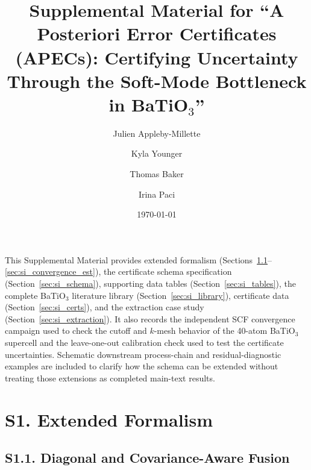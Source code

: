 ﻿\documentclass[prb,onecolumn,superscriptaddress,amsmath,amssymb,longbibliography]{revtex4-2}
\begin{document}
\title{Supplemental Material for ``A Posteriori Error Certificates (APECs): Certifying Uncertainty Through the Soft-Mode Bottleneck in BaTiO$_3$''}

\author{Julien Appleby-Millette}
\author{Kyla Younger}
\author{Thomas Baker}
\author{Irina Paci}

\date{\today}

\maketitle

This Supplemental Material provides extended formalism
(Sections~\ref{sec:si_covariance}--\ref{sec:si_convergence_est}), the
certificate schema specification (Section~\ref{sec:si_schema}), supporting
data tables (Section~\ref{sec:si_tables}), the complete BaTiO$_3$ literature
library (Section~\ref{sec:si_library}), certificate data
(Section~\ref{sec:si_certs}), and the extraction case study
(Section~\ref{sec:si_extraction}). It also records the independent SCF
convergence campaign used to check the cutoff and $k$-mesh behavior of the
40-atom BaTiO$_3$ supercell and the leave-one-out calibration check used to
test the certificate uncertainties. Schematic downstream process-chain and
residual-diagnostic examples are included to clarify how the schema can be
extended without treating those extensions as completed main-text results.

\section{S1. Extended Formalism}

\subsection{S1.1. Diagonal and Covariance-Aware Fusion}
\label{sec:si_covariance}
\end{document}
